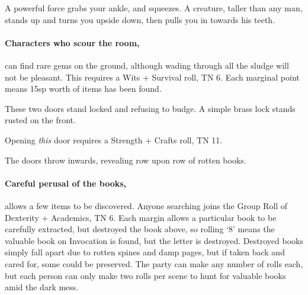 \begin{multicols}{2}
\begin{boxtext}

	A powerful force grabs your ankle, and squeezes.
	A creature, taller than any man, stands up and turns you upside down, then pulls you in towards his teeth.

\end{boxtext}



\paragraph{Characters who scour the room,}
can find rare gems on the ground, although wading through all the sludge will not be pleasant.
This requires a Wits + Survival roll, TN 6.
Each marginal point means 15sp worth of items has been found.


\begin{boxtext}

	These two doors stand locked and refusing to budge.  A simple brass lock stands rusted on the front.

\end{boxtext}

Opening \emph{this} door requires a Strength + Crafts roll, TN 11.

\begin{boxtext}
	The doors throw inwards, revealing row upon row of rotten books.
\end{boxtext}

\paragraph{Careful perusal of the books,}
allows a few items to be discovered.
Anyone searching joins the Group Roll of Dexterity + Academics, TN 6.
Each margin allows a particular book to be carefully extracted, but destroyed the book above, so rolling `8' means the valuable book on Invocation is found, but the letter is destroyed.
Destroyed books simply fall apart due to rotten spines and damp pages, but if taken back and cared for, some could be preserved.
The party can make any number of rolls each, but each person can only make two rolls per scene to hunt for valuable books amid the dark mess.

\begin{enumerate}


\end{enumerate}
\end{multicols}
